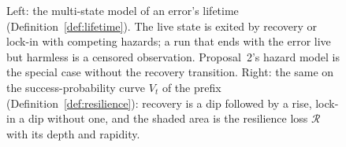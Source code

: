 \documentclass[10pt,a4paper]{article}
\begin{document}
\begin{figure}[h]
\caption{Left: the multi-state model of an error's lifetime (Definition~\ref{def:lifetime}). The live state is exited by recovery or lock-in with competing hazards; a run that ends with the error live but harmless is a censored observation. Proposal~2's hazard model is the special case without the recovery transition. Right: the same on the success-probability curve $V_t$ of the prefix (Definition~\ref{def:resilience}): recovery is a dip followed by a rise, lock-in a dip without one, and the shaded area is the resilience loss $\mathcal{R}$ with its depth and rapidity.}
\label{fig:lifecycle}
\end{figure}
\end{document}
